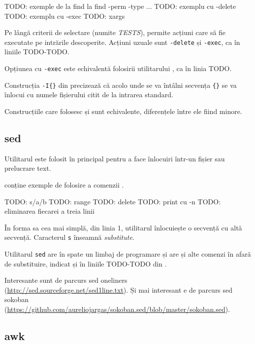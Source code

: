 \begin{screen}[caption={Folosirea find},label={lst:cli:find}]
TODO: exemple de la find la find -perm -type ...
TODO: exemplu cu -delete
TODO: exemplu cu -exec
TODO: xargs
\end{screen}

Pe lângă criterii de selectare (numite \textit{TESTS}),  permite acțiuni care să fie
executate pe intrările descoperite. Acțiuni uzuale sunt \texttt{-delete} și \texttt{-exec}, ca în liniile TODO-TODO.

Opțiunea cu \texttt{-exec} este echivalentă folosirii utilitarului , ca în linia TODO.

Construcția \texttt{-I\{\}} din  precizează că acolo unde se va întâlni secvența \texttt{\{\}} se va înlocui cu
numele fișierului citit de la intrarea standard.

Construcțiile care folosesc  și  sunt echivalente, diferențele între ele fiind minore.

\subsection{sed}
\label{sec:cli-sed}

Utilitarul  este folosit în principal pentru a face înlocuiri într-un fișier
sau prelucrare text.

 conține exemple de folosire a comenzii .

\begin{screen}[caption={Folosirea sed},label={lst:cli:sed}]
TODO: s/a/b
TODO: range
TODO: delete
TODO: print cu -n
TODO: eliminarea fiecarei a treia linii
\end{screen}

În forma sa cea mai simplă, din linia 1, utilitarul înlocuiește o secvență cu altă secvență. Caracterul \texttt{s} înseamnă \textit{substitute}.

Utilitarul \texttt{sed} are în spate un limbaj de programare și are și alte comenzi în afară de substituire, indicat și în liniile TODO-TODO din .

Interesante sunt de parcurs sed oneliners
(\url{http://sed.sourceforge.net/sed1line.txt}). Și mai interesant e de parcurs sed
sokoban (\url{https://github.com/aureliojargas/sokoban.sed/blob/master/sokoban.sed}).

\subsection{awk}
\label{sec:cli-awk}

